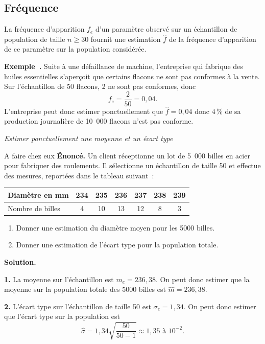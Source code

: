 \documentclass[11pt,a4paper]{article}
\newcounter{exemplenum}
\newcommand{\exnum}{\stepcounter{exemplenum}\textbf{Exemple~\theexemplenum.} }
\begin{document}
\subsection{Fréquence}

\begin{propriete}
La fréquence d'apparition $f_e$ d'un paramètre observé sur un échantillon de population de taille $n \geqslant 30$ fournit une estimation $\hat{f}$ de la fréquence d'apparition de ce paramètre sur la population considérée.
\end{propriete}

\begin{exemple}
\exnum Suite à une défaillance de machine, l'entreprise qui fabrique des huiles essentielles s'aperçoit que certains flacons ne sont pas conformes à la vente. Sur l'échantillon de 50 flacons, 2 ne sont pas conformes, donc
$$f_e = \dfrac{2}{50} = 0{,}04.$$
L'entreprise peut donc estimer ponctuellement que $\hat{f} = 0{,}04$ donc $4\,\%$ de sa production journalière de 10~000 flacons n'est pas conforme.
\end{exemple}

\begin{exo}
\textit{Estimer ponctuellement une moyenne et un écart type}
\medskip

{\color{blue} A faire chez eux}
\textbf{Énoncé.} Un client réceptionne un lot de 5~000 billes en acier pour fabriquer des roulements. Il sélectionne un échantillon de taille 50 et effectue des mesures, reportées dans le tableau suivant~:

\begin{center}
\begin{tabular}{|l|c|c|c|c|c|c|}
\hline
Diamètre en mm & 234 & 235 & 236 & 237 & 238 & 239 \\
\hline
Nombre de billes & 4 & 10 & 13 & 12 & 8 & 3 \\
\hline
\end{tabular}
\end{center}

\begin{enumerate}[leftmargin=6mm]
\item Donner une estimation du diamètre moyen pour les 5000 billes.
\item Donner une estimation de l'écart type pour la population totale.
\end{enumerate}

\textbf{Solution.}

\textbf{1.} La moyenne sur l'échantillon est $m_e = 236{,}38$.
On peut donc estimer que la moyenne sur la population totale des 5000 billes est $\hat{m} = 236{,}38$.

\textbf{2.} L'écart type sur l'échantillon de taille 50 est $\sigma_e = 1{,}34$.
On peut donc estimer que l'écart type sur la population est
$$\hat{\sigma} = 1{,}34 \sqrt{\dfrac{50}{50-1}} \approx 1{,}35 \text{ à } 10^{-2}.$$
\end{exo}
\end{document}
